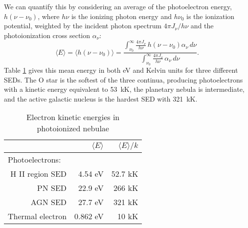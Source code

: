 \documentclass[debug, preprint, twocolumn]{rmaa}
\begin{document}
We can quantify this  by considering an average of the photoelectron energy,
$h ( \nu - \nu_0)$, where $h \nu$ is the ionizing photon energy and  $h \nu_0$
is the ionization potential, 
weighted by the incident photon spectrum ${4 \pi J_{\nu}} / {h\nu}$
and the photoionization cross section $\alpha_{\nu}$:
\begin{equation}
\langle  E \rangle = \langle h (\nu - \nu_0 ) \rangle  = \frac{\int_{\nu_0}^{\infty}\frac{4 \pi J_{\nu}}{{h\nu}}\, h(\nu - \nu_0) \alpha_\nu\, d\nu}
{\int_{\nu_0}^{\infty}\frac{4 \pi J_{\nu}}{{h\nu}}\, \alpha_\nu\, d\nu}. 
\end{equation}
Table \ref{tab:PhotoElectronEnergy} gives this mean energy in both
eV and Kelvin units for three different SEDs.  The O star
is the softest of the three continua, producing photoelectrons with a
kinetic energy equivalent to 53~kK, the planetary nebula is
intermediate, and the active galactic nucleus is the hardest SED with
321~kK.


\begin{table}
\centering
\caption{Electron kinetic energies in photoionized nebulae}
\label{tab:PhotoElectronEnergy}
\begin{tabular}{r r r}
\hline
 & $ \langle E \rangle $ & $\langle E\rangle / k $\\
  \hline
  \multicolumn{3}{l}{Photoelectrons:} \\
  H II region SED &  4.54 eV & 52.7 kK \\
  PN SED   & 22.9 eV  & 266  kK \\
  AGN SED  & 27.7 eV  & 321  kK \\
  \hline                        
Thermal electron   & 0.862 eV & 10 kK  \\
\hline
\end{tabular}
\end{table}
\end{document}
